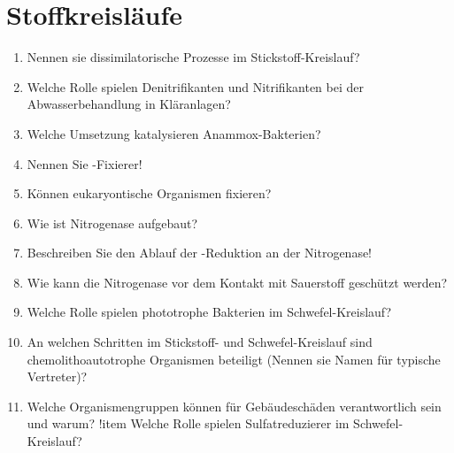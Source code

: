 
\section{Stoffkreisläufe}
\begin{enumerate}
	\item Nennen sie dissimilatorische Prozesse im Stickstoff-Kreislauf?
	\item Welche Rolle spielen Denitrifikanten und Nitrifikanten bei der Abwasserbehandlung in Kläranlagen?
	\item Welche Umsetzung katalysieren Anammox-Bakterien?
	\item Nennen Sie -Fixierer!
	\item Können eukaryontische Organismen  fixieren?
	\item Wie ist Nitrogenase aufgebaut?
	\item Beschreiben Sie den Ablauf der -Reduktion an der Nitrogenase!
	\item Wie kann die Nitrogenase vor dem Kontakt mit Sauerstoff geschützt werden?
	\item Welche Rolle spielen phototrophe Bakterien im Schwefel-Kreislauf?
	\item An welchen Schritten im Stickstoff- und Schwefel-Kreislauf sind chemolithoautotrophe Organismen beteiligt (Nennen sie Namen für typische Vertreter)?
	\item Welche Organismengruppen können für Gebäudeschäden verantwortlich sein und warum?
	!item Welche Rolle spielen Sulfatreduzierer im Schwefel-Kreislauf?
\end{enumerate}
